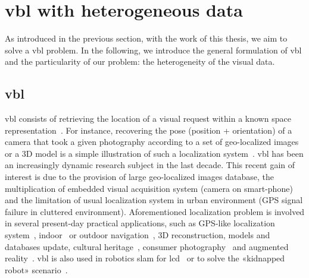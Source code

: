 \section{\Acl*{vbl} with heterogeneous data}

As introduced in the previous section, with the work of this thesis, we aim to solve a \ac{vbl} problem. In the following, we introduce the general formulation of \ac{vbl} and the particularity of our problem: the heterogeneity of the visual data.

\subsection{\Acl*{vbl}}
	\Ac{vbl} consists of retrieving the location of a visual request within a known space representation~\citep{Zamir2016, Piasco2017, Brejcha2017}. For instance, recovering the pose (position + orientation) of a camera that took a given photography according to a set of geo-localized images or a 3D model is a simple illustration of such a localization system~\citep{Kendall2015, Sattler2016a}. \ac{vbl} has been an increasingly dynamic research subject in the last decade. This recent gain of interest is due to the provision of large geo-localized images database, the multiplication of embedded visual acquisition system (\eg camera on smart-phone) and the limitation of usual localization system in urban environment (\eg GPS signal failure in cluttered environment). Aforementioned localization problem is involved in several present-day practical applications, such as GPS-like localization system~\citep{Armagan2017b}, indoor~\citep{Cavallari2018} or outdoor navigation~\citep{Brahmbhatt2017}, 3D reconstruction, models and databases update, cultural heritage~\citep{Bhowmik2017}, consumer photography~\citep{Hays2008, Weyand2016} and augmented reality~\citep{Glocker2013}. \Ac{vbl} is also used in robotics \ac{slam} for \ac{lcd}~\citep{Garg2018a} or to solve the «kidnapped robot» scenario~\citep{Cupec}.
	
